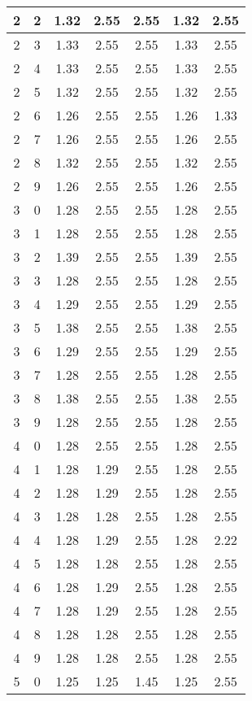 \begin{longtable}{|c|c||c||c|c||c|c|}
	2 & 2 & 1.32 & 2.55 & 2.55 & 1.32 & 2.55 \\ \hline
	2 & 3 & 1.33 & 2.55 & 2.55 & 1.33 & 2.55 \\ \hline
	2 & 4 & 1.33 & 2.55 & 2.55 & 1.33 & 2.55 \\ \hline
	2 & 5 & 1.32 & 2.55 & 2.55 & 1.32 & 2.55 \\ \hline
	2 & 6 & 1.26 & 2.55 & 2.55 & 1.26 & 1.33 \\ \hline
	2 & 7 & 1.26 & 2.55 & 2.55 & 1.26 & 2.55 \\ \hline
	2 & 8 & 1.32 & 2.55 & 2.55 & 1.32 & 2.55 \\ \hline
	2 & 9 & 1.26 & 2.55 & 2.55 & 1.26 & 2.55 \\ \hline
	3 & 0 & 1.28 & 2.55 & 2.55 & 1.28 & 2.55 \\ \hline
	3 & 1 & 1.28 & 2.55 & 2.55 & 1.28 & 2.55 \\ \hline
	3 & 2 & 1.39 & 2.55 & 2.55 & 1.39 & 2.55 \\ \hline
	3 & 3 & 1.28 & 2.55 & 2.55 & 1.28 & 2.55 \\ \hline
	3 & 4 & 1.29 & 2.55 & 2.55 & 1.29 & 2.55 \\ \hline
	3 & 5 & 1.38 & 2.55 & 2.55 & 1.38 & 2.55 \\ \hline
	3 & 6 & 1.29 & 2.55 & 2.55 & 1.29 & 2.55 \\ \hline
	3 & 7 & 1.28 & 2.55 & 2.55 & 1.28 & 2.55 \\ \hline
	3 & 8 & 1.38 & 2.55 & 2.55 & 1.38 & 2.55 \\ \hline
	3 & 9 & 1.28 & 2.55 & 2.55 & 1.28 & 2.55 \\ \hline
	4 & 0 & 1.28 & 2.55 & 2.55 & 1.28 & 2.55 \\ \hline
	4 & 1 & 1.28 & 1.29 & 2.55 & 1.28 & 2.55 \\ \hline
	4 & 2 & 1.28 & 1.29 & 2.55 & 1.28 & 2.55 \\ \hline
	4 & 3 & 1.28 & 1.28 & 2.55 & 1.28 & 2.55 \\ \hline
	4 & 4 & 1.28 & 1.29 & 2.55 & 1.28 & 2.22 \\ \hline
	4 & 5 & 1.28 & 1.28 & 2.55 & 1.28 & 2.55 \\ \hline
	4 & 6 & 1.28 & 1.29 & 2.55 & 1.28 & 2.55 \\ \hline
	4 & 7 & 1.28 & 1.29 & 2.55 & 1.28 & 2.55 \\ \hline
	4 & 8 & 1.28 & 1.28 & 2.55 & 1.28 & 2.55 \\ \hline
	4 & 9 & 1.28 & 1.28 & 2.55 & 1.28 & 2.55 \\ \hline
	5 & 0 & 1.25 & 1.25 & 1.45 & 1.25 & 2.55 \\ \hline

\end{longtable}
